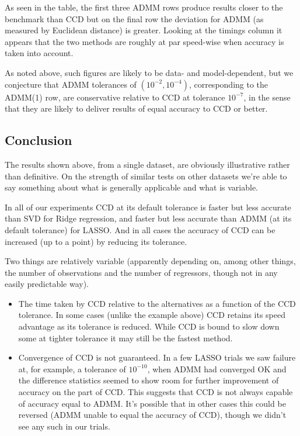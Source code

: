 \documentclass{article}
\begin{document}
As seen in the table, the first three ADMM rows produce results closer
to the benchmark than CCD but on the final row the deviation for ADMM
(as measured by Euclidean distance) is greater. Looking at the timings
column it appears that the two methods are roughly at par speed-wise
when accuracy is taken into account.

As noted above, such figures are likely to be data- and
model-dependent, but we conjecture that ADMM tolerances of
$(10^{-2}, 10^{-4})$, corresponding to the ADMM(1) row, are
conservative relative to CCD at tolerance $10^{-7}$, in the sense that
they are likely to deliver results of equal accuracy to CCD or better.

\subsection*{Conclusion}

The results shown above, from a single dataset, are obviously
illustrative rather than definitive. On the strength of similar tests
on other datasets we're able to say something about what is generally
applicable and what is variable.

In all of our experiments CCD at its default tolerance is faster but
less accurate than SVD for Ridge regression, and faster but less
accurate than ADMM (at its default tolerance) for LASSO. And in all
cases the accuracy of CCD can be increased (up to a point) by
reducing its tolerance.

Two things are relatively variable (apparently depending on, among other
things, the number of observations and the number of regressors,
though not in any easily predictable way).
\begin{itemize}
\item The time taken by CCD relative to the alternatives as a function
  of the CCD tolerance. In some cases (unlike the example above) CCD
  retains its speed advantage as its tolerance is reduced. While CCD
  is bound to slow down some at tighter tolerance it may still be the
  fastest method.
\item Convergence of CCD is not guaranteed. In a few LASSO trials we
  saw failure at, for example, a tolerance of $10^{-10}$, when ADMM
  had converged OK and the difference statistics seemed to show room
  for further improvement of accuracy on the part of CCD. This
  suggests that CCD is not always capable of accuracy equal to
  ADMM. It's possible that in other cases this could be reversed (ADMM
  unable to equal the accuracy of CCD), though we didn't see any such
  in our trials.
\end{itemize}
\end{document}
